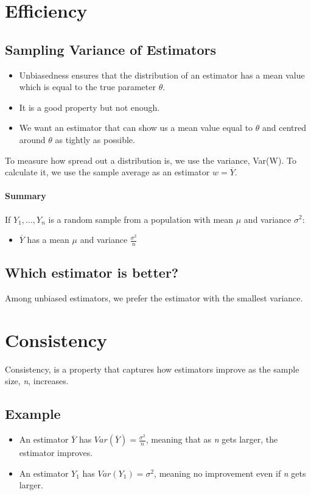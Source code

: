 \documentclass[11pt,a4paper]{report}
\begin{document}
\section{Efficiency}
\subsection{Sampling Variance of Estimators}
\begin{itemize}
    \item Unbiasedness ensures that the distribution of an estimator has a mean value which is equal to the true parameter $\theta$.
    \item It is a good property but not enough.
    \item We want an estimator that can show us a mean value equal to $\theta$ and centred around $\theta$ as tightly as possible.
\end{itemize}
To measure how spread out a distribution is, we use the variance, Var(W). To calculate it, we use the sample average as an estimator $w = \overline{Y}$.
\paragraph{Summary}
If ${Y_1, ..., Y_n}$ is a random sample from a population with mean $\mu$ and variance $\sigma^2$:
\begin{itemize}
    \item $\overline{Y}$ has a mean $\mu$ and variance $\frac{\sigma^2}{n}$
\end{itemize}
\subsection{Which estimator is better?}
Among unbiased estimators, we prefer the estimator with the smallest variance.

\section{Consistency}
Consistency, is a property that captures how estimators improve as the sample size, \textit{n}, increases.
\subsection{Example}
\begin{itemize}
    \item An estimator $\overline{Y}$ has $Var(\overline{Y}) = \frac{\sigma^2}{n}$, meaning that as \textit{n} gets larger, the estimator improves.
    \item An estimator $Y_1$ has $Var(Y_1) = \sigma^2$, meaning no improvement even if \textit{n} gets larger.
\end{itemize}
\end{document}
